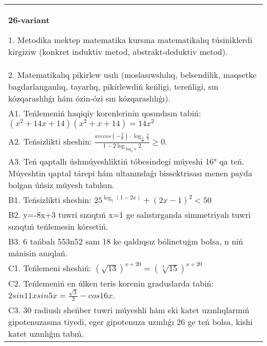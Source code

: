 \documentclass{article}
\begin{document}
\begin{tabular}{m{17cm}}
\textbf{26-variant}

1. Metodika mektep matematika kursına matematikalıq túsiniklerdi kirgiziw (konkret induktiv metod, abstrakt-deduktiv metod). \\
2. Matematikalıq pikirlew usılı (moslasıwshılıq, belsendilik, maqsetke bagdarlanganlıq, tayarlıq, pikirlewdiń keńligi, tereńligi, sın kózqaraslılıǵı hám ózin-ózi sın kózqaraslılıǵı). \\
A1. Teńlemeniń haqiqiy korenlerinin qosındısın tabiń: \((x^2 + 14x + 14) (x^2 + x + 14) = 14x^2\) \\
A2. Teńsizlikti sheshin: \(\frac{arccos (- \frac{3}{\pi}) \cdot \log_{\frac{3}{\pi}}\frac{\pi}{4}}{1 - 2\log_{\log_{2}x}2} \geq 0\). \\
A3. Teń qaptallı úshmúyeshliktiń tóbesindegi múyeshi 16° qa teń. Múyeshtin qaptal tárepi hám ultanındaǵı bissektrisası menen payda bolgan úńsiz múyesh tabılsın. \\
B1. Teńsizlikti sheshin: \(25^{\log_{5}{ (1 - 2x) }} + { (2x - 1) }^{2} < 50\) \\
B2. y=-8x+3 tuwri sızıqtıń x=1 ge salıstırganda simmetriyalı tuwri sızıqtıń teńlemesin kórsetiń. \\
B3. 6 tańbalı 553n52 sanı 18 ke qaldıqsız bólinetuģın bolsa, n niń mánisin anıqlań. \\
C1. Teńlemeni sheshiń: \((\sqrt{13}) ^{x + 20} = (\sqrt[3]{15}) ^{x + 20}\) \\
C2. Teńlemeniń en úlken teris korenin graduslarda tabiń: \(2sin11xsin5x = \frac{\sqrt{3}}{2} - cos16x\). \\
C3. 30 radiuslı sheńber tuwri múyeshli hám eki katet uzınlıqlarınıń gipotenuzasına tiyedi, eger gipotenuza uzınlıǵı 26 ge teń bolsa, kishi katet uzınlıǵın tabıń. \\

\end{tabular}
\vspace{1cm}
\end{document}
